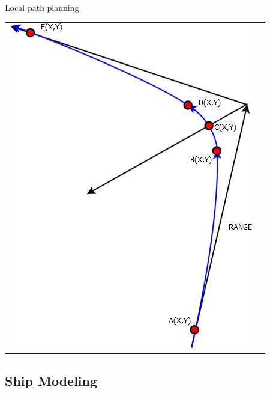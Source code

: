 \begin{frame}{Local path planning}
\begin{tabular}{l l}
\begin{minipage}{0.3\textwidth}
					\includegraphics[width = \textwidth]{control/img/positioning2}
				\end{minipage}
			\end{tabular}
			
		
\end{frame}

\subsection{Ship Modeling}



